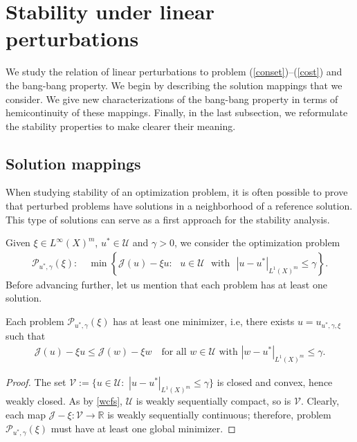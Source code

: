 \documentclass[hidelinks,onefignum,onetabnum]{siamart220329}
\begin{document}
\section{Stability under linear perturbations}\label{Sstab}
 We study the relation of linear perturbations to problem (\ref{conset})--(\ref{cost}) and the bang-bang property. We begin by describing the solution mappings that we consider.  We  give new characterizations of the bang-bang property in terms of hemicontinuity of these mappings. Finally, in the last subsection, we reformulate the stability properties  to make clearer their meaning.

\subsection{Solution mappings}
When studying stability of an optimization problem, it is often possible to prove that  perturbed problems have solutions in a neighborhood of a reference solution. This type of solutions can serve as a first approach for the stability analysis. 


Given $\xi\in {L^\infty(X)^m}$, $u^*\in\mathcal U$ and $\gamma>0$, we  consider the optimization problem
\begin{align*}
	\mathcal P_{u^*,\gamma}(\xi):\quad\min_{}\left\lbrace \mathcal J(u)-\xi u:\,\,\,\,u\in\mathcal U\,\,\,\,\text{with}\,\,\,\,|u-u^*|_{{L^1(X)^m}}\le\gamma\right\rbrace.
\end{align*}
Before advancing further, let us mention that each problem has at least one solution.

\begin{proposition}\label{exisper}
	Each problem $\mathcal P_{u^*,\gamma}(\xi)$ has at least one minimizer, i.e, there exists $u=u_{u^*,\gamma,\xi}$ such that 
	\begin{align*}
		\mathcal J(u)-\xi u\le \mathcal J(w)-\xi w\quad\text{for all $w\in\mathcal U$ with $|w-u^*|_{L^1(X)^m}\le \gamma$}.
	\end{align*}
\end{proposition}
\begin{proof}
	The set $\mathcal V:=\{u\in\mathcal U:\,\, |u-u^*|_{L^1(X)^m}\le\gamma\}$ is closed and convex, hence weakly closed. As by \cref{wcfs}, $\mathcal U$ is weakly sequentially compact, so is $\mathcal V$. Clearly, each map $\mathcal J-\xi:\mathcal V\to \mathbb R$ is weakly sequentially continuous; therefore, problem $\mathcal P_{u^*,\gamma}(\xi)$ must have at least one global minimizer.
\end{proof}
\end{document}
